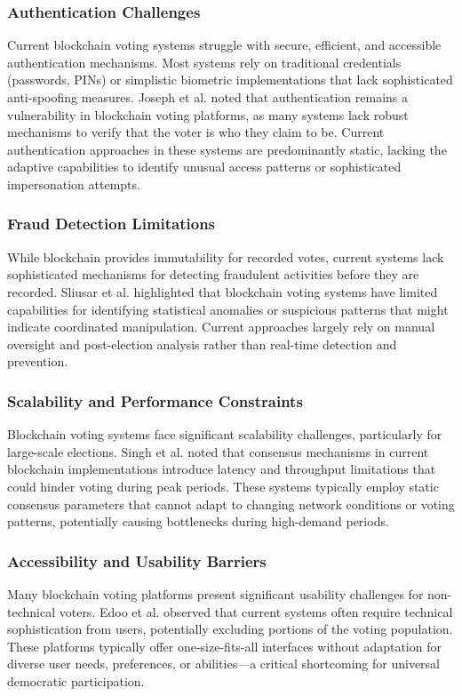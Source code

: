 \documentclass[conference]{IEEEtran}
\begin{document}
\subsubsection{Authentication Challenges}
Current blockchain voting systems struggle with secure, efficient, and accessible authentication mechanisms. Most systems rely on traditional credentials (passwords, PINs) or simplistic biometric implementations that lack sophisticated anti-spoofing measures. Joseph et al. \cite{b6} noted that authentication remains a vulnerability in blockchain voting platforms, as many systems lack robust mechanisms to verify that the voter is who they claim to be. Current authentication approaches in these systems are predominantly static, lacking the adaptive capabilities to identify unusual access patterns or sophisticated impersonation attempts.

\subsubsection{Fraud Detection Limitations}
While blockchain provides immutability for recorded votes, current systems lack sophisticated mechanisms for detecting fraudulent activities before they are recorded. Sliusar et al. \cite{b4} highlighted that blockchain voting systems have limited capabilities for identifying statistical anomalies or suspicious patterns that might indicate coordinated manipulation. Current approaches largely rely on manual oversight and post-election analysis rather than real-time detection and prevention.

\subsubsection{Scalability and Performance Constraints}
Blockchain voting systems face significant scalability challenges, particularly for large-scale elections. Singh et al. \cite{b5} noted that consensus mechanisms in current blockchain implementations introduce latency and throughput limitations that could hinder voting during peak periods. These systems typically employ static consensus parameters that cannot adapt to changing network conditions or voting patterns, potentially causing bottlenecks during high-demand periods.

\subsubsection{Accessibility and Usability Barriers}
Many blockchain voting platforms present significant usability challenges for non-technical voters. Edoo et al. \cite{b7} observed that current systems often require technical sophistication from users, potentially excluding portions of the voting population. These platforms typically offer one-size-fits-all interfaces without adaptation for diverse user needs, preferences, or abilities—a critical shortcoming for universal democratic participation.
\end{document}
